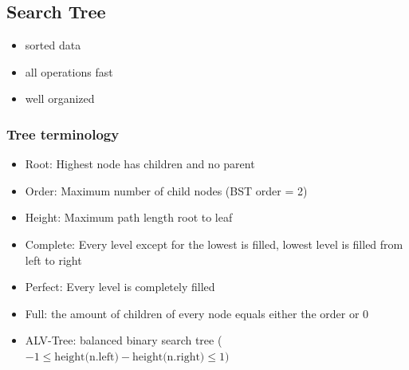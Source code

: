 \subsection{Search Tree}
    \begin{itemize}
        \item sorted data
        \item all operations fast
        \item well organized
    \end{itemize}
    \subsubsection{Tree terminology} \label{sec_tree_terminology}
        \begin{itemize}
            \item Root: Highest node has children and no parent
            \item Order: Maximum number of child nodes (BST order = 2)
            \item Height: Maximum path length root to leaf
            \item Complete: Every level except for the lowest is filled, lowest level is filled from left to right
            \item Perfect: Every level is completely filled
            \item Full: the amount of children of every node equals either the order or 0
            \item ALV-Tree: balanced binary search tree ($-1 \leq \text{height(n.left)} - \text{height(n.right)} \leq 1)$
        \end{itemize}
    
